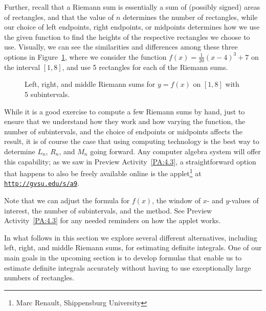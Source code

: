 Further, recall that a Riemann sum is essentially a sum of (possibly signed) areas of rectangles, and that the value of $n$ determines the number of rectangles, while our choice of left endpoints, right endpoints, or midpoints determines how we use the given function to find the heights of the respective rectangles we choose to use.  Visually, we can see the similarities and differences among these three options in Figure~\ref{F:5.6.LRMsum}, where we consider the function $f(x) = \frac{1}{20}(x-4)^3 + 7$ on the interval $[1,8]$, and use 5 rectangles for each of the Riemann sums.

\begin{figure}[h]
\begin{center}
\caption{Left, right, and middle Riemann sums for $y = f(x)$ on $[1,8]$ with 5 subintervals.} \label{F:5.6.LRMsum}
\end{center}
\end{figure}

While it is a good exercise to compute a few Riemann sums by hand, just to ensure that we understand how they work and how varying the function, the number of subintervals, and the choice of endpoints or midpoints affects the result, it is of course the case that using computing technology is the best way to determine $L_n$, $R_n$, and $M_n$ going forward.  Any computer algebra system will offer this capability; as we saw in Preview Activity~\ref{PA:4.3}, a straightforward option that happens to also be freely available online is the applet\footnote{Marc Renault, Shippensburg University} at \href{http://gvsu.edu/s/a9}{\texttt{http://gvsu.edu/s/a9}}.  

Note that we can adjust the formula for $f(x)$, the window of $x$- and $y$-values of interest, the number of subintervals, and the method.  See  Preview Activity~\ref{PA:4.3} for any needed reminders on how the applet works.

In what follows in this section we explore several different alternatives, including left, right, and middle Riemann sums, for estimating definite integrals.  One of our main goals in the upcoming section is to develop formulas that enable us to estimate definite integrals accurately without having to use exceptionally large numbers of rectangles.

